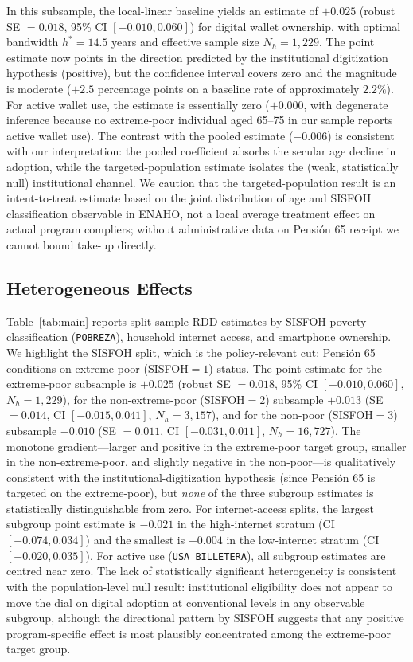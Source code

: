 \documentclass[12pt]{article}
\begin{document}
In this subsample, the local-linear baseline yields an estimate of $+0.025$ (robust SE $=0.018$, 95\% CI $[-0.010, 0.060]$) for digital wallet ownership, with optimal bandwidth $h^* = 14.5$ years and effective sample size $N_h = 1{,}229$. The point estimate now points in the direction predicted by the institutional digitization hypothesis (positive), but the confidence interval covers zero and the magnitude is moderate ($+2.5$ percentage points on a baseline rate of approximately $2.2\%$). For active wallet use, the estimate is essentially zero ($+0.000$, with degenerate inference because no extreme-poor individual aged 65--75 in our sample reports active wallet use). The contrast with the pooled estimate ($-0.006$) is consistent with our interpretation: the pooled coefficient absorbs the secular age decline in adoption, while the targeted-population estimate isolates the (weak, statistically null) institutional channel. We caution that the targeted-population result is an intent-to-treat estimate based on the joint distribution of age and SISFOH classification observable in ENAHO, not a local average treatment effect on actual program compliers; without administrative data on Pensi\'on 65 receipt we cannot bound take-up directly.

\subsection{Heterogeneous Effects}

Table~\ref{tab:main} reports split-sample RDD estimates by SISFOH poverty classification (\texttt{POBREZA}), household internet access, and smartphone ownership. We highlight the SISFOH split, which is the policy-relevant cut: Pensi\'on 65 conditions on extreme-poor (SISFOH$=1$) status. The point estimate for the extreme-poor subsample is $+0.025$ (robust SE $=0.018$, 95\% CI $[-0.010, 0.060]$, $N_h\!=\!1{,}229$), for the non-extreme-poor (SISFOH$=2$) subsample $+0.013$ (SE $=0.014$, CI $[-0.015, 0.041]$, $N_h\!=\!3{,}157$), and for the non-poor (SISFOH$=3$) subsample $-0.010$ (SE $=0.011$, CI $[-0.031, 0.011]$, $N_h\!=\!16{,}727$). The monotone gradient---larger and positive in the extreme-poor target group, smaller in the non-extreme-poor, and slightly negative in the non-poor---is qualitatively consistent with the institutional-digitization hypothesis (since Pensi\'on 65 is targeted on the extreme-poor), but \emph{none} of the three subgroup estimates is statistically distinguishable from zero. For internet-access splits, the largest subgroup point estimate is $-0.021$ in the high-internet stratum (CI $[-0.074, 0.034]$) and the smallest is $+0.004$ in the low-internet stratum (CI $[-0.020, 0.035]$). For active use (\texttt{USA\_BILLETERA}), all subgroup estimates are centred near zero. The lack of statistically significant heterogeneity is consistent with the population-level null result: institutional eligibility does not appear to move the dial on digital adoption at conventional levels in any observable subgroup, although the directional pattern by SISFOH suggests that any positive program-specific effect is most plausibly concentrated among the extreme-poor target group.
\end{document}
